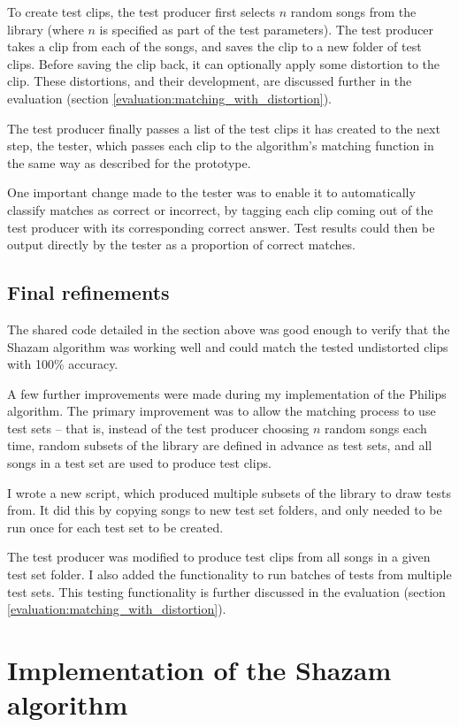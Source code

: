 \documentclass[12pt,a4paper,twoside,openright]{report}
\begin{document}
To create test clips, the test producer first selects $n$ random songs from the library (where $n$ is specified as part of the test parameters). The test producer takes a clip from each of the songs, and saves the clip to a new folder of test clips. Before saving the clip back, it can optionally apply some distortion to the clip. These distortions, and their development, are discussed further in the evaluation (section \ref{evaluation:matching_with_distortion}).

The test producer finally passes a list of the test clips it has created to the next step, the tester, which passes each clip to the algorithm's matching function in the same way as described for the prototype.

One important change made to the tester was to enable it to automatically classify matches as correct or incorrect, by tagging each clip coming out of the test producer with its corresponding correct answer. Test results could then be output directly by the tester as a proportion of correct matches.


\subsection{Final refinements}

The shared code detailed in the section above was good enough to verify that the Shazam algorithm was working well and could match the tested undistorted clips with 100\% accuracy.

A few further improvements were made during my implementation of the Philips algorithm. The primary improvement was to allow the matching process to use test sets -- that is, instead of the test producer choosing $n$ random songs each time, random subsets of the library are defined in advance as test sets, and all songs in a test set are used to produce test clips.

I wrote a new script, which produced multiple subsets of the library to draw tests from. It did this by copying songs to new test set folders, and only needed to be run once for each test set to be created. 

The test producer was modified to produce test clips from all songs in a given test set folder. I also added the functionality to run batches of tests from multiple test sets. This testing functionality is further discussed in the evaluation (section \ref{evaluation:matching_with_distortion}). 


\section{Implementation of the Shazam algorithm}
\label{section:shazam}
\end{document}
